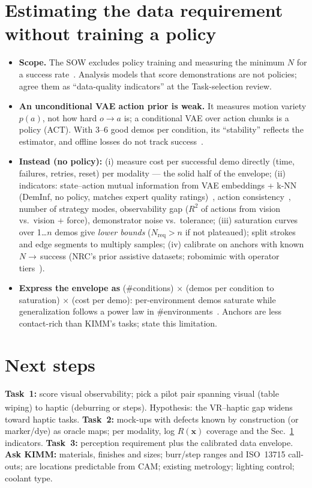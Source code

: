 \documentclass[10pt,a4paper]{article}
\newcommand{\infr}{\textsuperscript{\textcolor{cB}{\dag}}}
\begin{document}
\section{Estimating the data requirement without training a policy}
\label{sec:data}
\begin{itemize}
\item \textbf{Scope.}
The SOW excludes policy training and measuring the minimum $N$ for a success rate~\cite{sow}.
Analysis models that score demonstrations are not policies; agree them as ``data-quality indicators'' at the Task-selection review.
\item \textbf{An unconditional VAE action prior is weak.}
It measures motion variety $p(a)$, not how hard $o\!\to\!a$ is; a conditional VAE over action chunks is a policy (ACT).
With 3--6 good demos per condition, its ``stability'' reflects the estimator, and offline losses do not track success~\cite{robomimic}.
\item \textbf{Instead (no policy):} (i) measure cost per successful demo directly (time, failures, retries, reset) per modality --- the solid half of the envelope; (ii) indicators: state--action mutual information from VAE embeddings + k-NN (DemInf, no policy, matches expert quality ratings)~\cite{deminf}, action consistency~\cite{dataquality}, number of strategy modes, observability gap ($R^2$ of actions from vision vs.\ vision + force), demonstrator noise vs.\ tolerance; (iii) saturation curves over 1\ldots$n$ demos give \emph{lower bounds} ($N_{\text{req}}>n$ if not plateaued); split strokes and edge segments to multiply samples; (iv) calibrate on anchors with known $N\!\to$\,success (NRC's prior assistive datasets; robomimic with operator tiers~\cite{robomimic}).
\item \textbf{Express the envelope as} (\#conditions) $\times$ (demos per condition to saturation) $\times$ (cost per demo): per-environment demos saturate while generalization follows a power law in \#environments~\cite{scaling}.
Anchors are less contact-rich than KIMM's tasks; state this limitation.
\end{itemize}

\section{Next steps}
\textbf{Task~1:} score visual observability; pick a pilot pair spanning visual (table wiping) to haptic (deburring or steps).
Hypothesis\infr: the VR--haptic gap widens toward haptic tasks.
\textbf{Task~2:} mock-ups with defects known by construction (or marker/dye) as oracle maps; per modality, log $R(\mathbf{x})$ coverage and the Sec.~\ref{sec:data} indicators.
\textbf{Task~3:} perception requirement plus the calibrated data envelope.
\textbf{Ask KIMM:} materials, finishes and sizes; burr/step ranges and ISO~13715 call-outs; are locations predictable from CAM; existing metrology; lighting control; coolant type.
\end{document}
